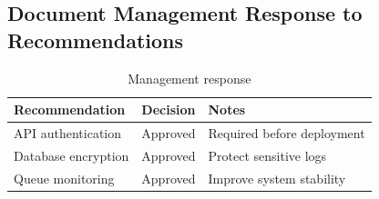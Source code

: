 \subsection{Document Management Response to Recommendations}
\begin{table}[H]
    \centering
    \renewcommand{\arraystretch}{1.2}
    \begin{tabularx}{\textwidth}{|X|c|X|}
        \hline
        \textbf{Recommendation} & \textbf{Decision} & \textbf{Notes} \\
        \hline
        API authentication & Approved & Required before deployment \\
        \hline
        Database encryption & Approved & Protect sensitive logs \\
        \hline
        Queue monitoring & Approved & Improve system stability \\
        \hline
    \end{tabularx}
    \caption{Management response}
\end{table}

